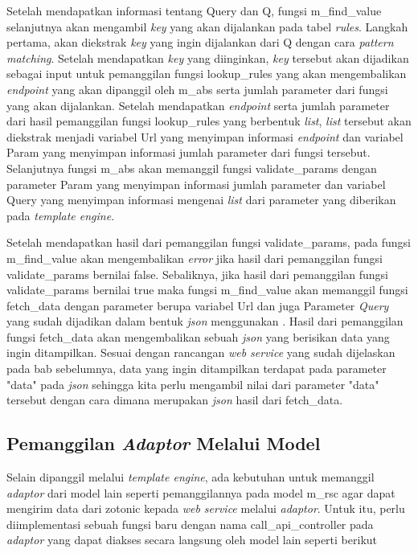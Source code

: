 Setelah mendapatkan informasi tentang Query dan Q, fungsi m\_find\_value selanjutnya akan mengambil \textit{key} yang akan dijalankan pada tabel \textit{rules}. Langkah pertama, akan diekstrak \textit{key} yang ingin dijalankan dari Q dengan cara \textit{pattern matching}. Setelah mendapatkan \textit{key} yang diinginkan, \textit{key} tersebut akan dijadikan sebagai input untuk pemanggilan fungsi lookup\_rules yang akan mengembalikan \textit{endpoint} yang akan dipanggil oleh m\_abs serta jumlah parameter dari fungsi yang akan dijalankan. Setelah mendapatkan \textit{endpoint} serta jumlah parameter dari hasil pemanggilan fungsi lookup\_rules yang berbentuk \textit{list}, \textit{list} tersebut akan diekstrak menjadi variabel Url yang menyimpan informasi \textit{endpoint} dan variabel Param yang menyimpan informasi jumlah parameter dari fungsi tersebut. Selanjutnya fungsi m\_abs akan memanggil fungsi validate\_params dengan parameter Param yang menyimpan informasi jumlah parameter dan variabel Query yang menyimpan informasi mengenai \textit{list} dari parameter yang diberikan pada \textit{template engine}.

Setelah mendapatkan hasil dari pemanggilan fungsi validate\_params, pada fungsi m\_find\_value akan mengembalikan \textit{error} jika hasil dari pemanggilan fungsi validate\_params bernilai false. Sebaliknya, jika hasil dari pemanggilan fungsi validate\_params bernilai true maka fungsi m\_find\_value akan memanggil fungsi fetch\_data dengan parameter berupa variabel Url dan juga Parameter \textit{Query} yang sudah dijadikan dalam bentuk \textit{json} menggunakan . Hasil dari pemanggilan fungsi fetch\_data akan mengembalikan sebuah \textit{json} yang berisikan data yang ingin ditampilkan. Sesuai dengan rancangan \textit{web service} yang sudah dijelaskan pada bab sebelumnya, data yang ingin ditampilkan terdapat pada parameter "data" pada \textit{json} sehingga kita perlu mengambil nilai dari parameter "data" tersebut dengan cara  dimana  merupakan \textit{json} hasil dari fetch\_data.

\subsection{Pemanggilan \textit{Adaptor} Melalui Model}

Selain dipanggil melalui \textit{template engine}, ada kebutuhan untuk memanggil \textit{adaptor} dari model lain seperti pemanggilannya pada model m\_rsc agar dapat mengirim data dari zotonic kepada \textit{web service} melalui \textit{adaptor}. Untuk itu, perlu diimplementasi sebuah fungsi baru dengan nama call\_api\_controller pada \textit{adaptor} yang dapat diakses secara langsung oleh model lain seperti berikut

